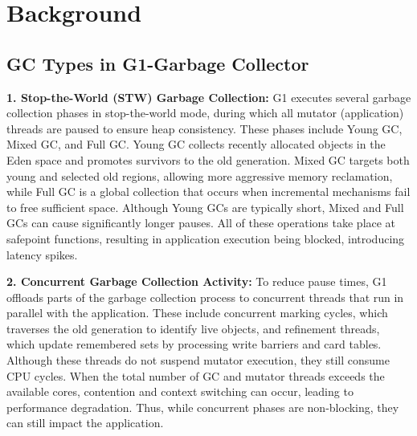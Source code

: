 \section{Background}

%
%

\subsection{GC Types in G1-Garbage Collector} 

\textbf{1. Stop-the-World (STW) Garbage Collection:} G1 executes several garbage collection 
phases in stop-the-world mode, during which all mutator (application) threads are paused to 
ensure heap consistency. These phases include Young GC, Mixed GC, and Full GC. Young GC 
collects recently allocated objects in the Eden space and promotes survivors to the old 
generation. Mixed GC targets both young and selected old regions, allowing more aggressive 
memory reclamation, while Full GC is a global collection that occurs when incremental 
mechanisms fail to free sufficient space. Although Young GCs are typically short, Mixed and 
Full GCs can cause significantly longer pauses. All of these operations take place at safepoint 
functions, resulting in application execution being blocked, introducing latency spikes.

\textbf{2. Concurrent Garbage Collection Activity:} To reduce pause times, 
G1 offloads parts of the garbage collection process to concurrent threads 
that run in parallel with the application. These include concurrent marking 
cycles, which traverses the old generation to identify live objects, and 
refinement threads, which update remembered sets by processing write barriers and card tables. 
Although these threads do not suspend mutator execution, they still consume CPU cycles. When 
the total number of GC and mutator threads exceeds the available cores, contention and context 
switching can occur, leading to performance degradation. Thus, while concurrent phases are non-blocking, 
they can still impact the application.


